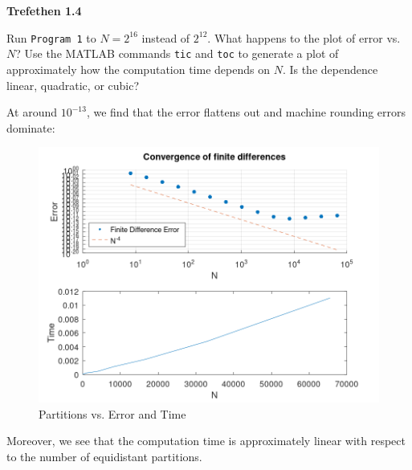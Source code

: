 \textbf{Trefethen 1.4}

Run \texttt{Program 1} to $N = 2^{16}$ instead of $2^{12}$. What happens to the plot of error vs. $N$? Use the MATLAB commands 
\texttt{tic} and \texttt{toc} to generate a plot of approximately how the computation time depends on $N$. Is the dependence
linear, quadratic, or cubic?

\begin{solution}
  At around $10^{-13}$, we find that the error flattens out and machine rounding errors dominate:

  \begin{figure}[h]
    \centering
    \includegraphics[width=\textwidth]{problem_1_fd.png}
    \caption{Partitions vs. Error and Time}
  \end{figure}

  Moreover, we see that the computation time is approximately linear with respect to the number of equidistant partitions.
  \ \\
\end{solution}